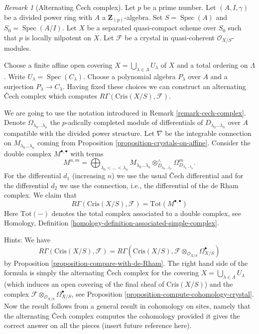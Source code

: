 \documentclass{stacks-project}
\theoremstyle{plain}
\theoremstyle{definition}
\theoremstyle{remark}
\newtheorem{remark}[subsection]{Remark}
\numberwithin{equation}{subsection}
\def\Spec{\mathop{\mathrm{Spec}}}
\begin{document}
\begin{remark}[Alternating {\v C}ech complex]
\label{remark-alternating-cech-complex}
Let $p$ be a prime number. Let $(A, I, \gamma)$ be a divided power
ring with $A$ a $\mathbf{Z}_{(p)}$-algebra. Set $S = \Spec(A)$ and
$S_0 = \Spec(A/I)$. Let $X$ be a separated quasi-compact scheme
over $S_0$ such that $p$ is locally nilpotent on $X$. Let
$\mathcal{F}$ be a crystal in quasi-coherent $\mathcal{O}_{X/S}$-modules.

\medskip\noindent
Choose a finite affine open covering
$X = \bigcup_{\lambda \in \Lambda} U_\lambda$ of $X$
and a total ordering on $\Lambda$.
Write $U_\lambda = \Spec(C_\lambda)$. Choose a polynomial algebra
$P_\lambda$ over $A$ and a surjection $P_\lambda \to C_\lambda$.
Having fixed these choices we can construct an alternating
{\v C}ech complex which computes $R\Gamma(\text{Cris}(X/S), \mathcal{F})$.

\medskip\noindent
We are going to use the notation introduced in
Remark \ref{remark-cech-complex}.
Denote $\Omega_{\lambda_0 \ldots \lambda_n}$
the $p$-adically completed module of differentials of
$D_{\lambda_0 \ldots \lambda_n}$ over $A$ compatible with the divided power
structure. Let $\nabla$ be the integrable connection on
$M_{\lambda_0 \ldots \lambda_n}$ coming from
Proposition \ref{proposition-crystals-on-affine}.
Consider the double complex $M^{\bullet, \bullet}$ with
terms
$$
M^{n, m} =
\bigoplus\nolimits_{\lambda_0 < \ldots < \lambda_n}
M_{\lambda_0 \ldots \lambda_n}
\otimes^\wedge_{D_{\lambda_0 \ldots \lambda_n}}
\Omega^m_{D_{\lambda_0 \ldots \lambda_n}}.
$$
For the differential $d_1$ (increasing $n$) we use the usual
{\v C}ech differential and for the differential $d_2$ we use
the connection, i.e., the differential of the de Rham complex.
We claim that
$$
R\Gamma(\text{Cris}(X/S), \mathcal{F}) = \text{Tot}(M^{\bullet, \bullet})
$$
Here $\text{Tot}(-)$ denotes the total complex associated to a
double complex, see
Homology, Definition \ref{homology-definition-associated-simple-complex}.

\medskip\noindent
Hints: We have
$$
R\Gamma(\text{Cris}(X/S), \mathcal{F}) = R\Gamma(\text{Cris}(X/S),
\mathcal{F} \otimes_{\mathcal{O}_{X/S}} \Omega_{X/S}^\bullet)
$$
by Proposition \ref{proposition-compare-with-de-Rham}.
The right hand side of the formula is simply the alternating {\v C}ech complex
for the covering $X = \bigcup_{\lambda \in \Lambda} U_\lambda$
(which induces an open covering of the final sheaf of $\text{Cris}(X/S)$)
and the complex $\mathcal{F} \otimes_{\mathcal{O}_{X/S}} \Omega_{X/S}^\bullet$,
see Proposition \ref{proposition-compute-cohomology-crystal}.
Now the result follows from a general result in cohomology on sites,
namely that the alternating {\v C}ech complex computes the cohomology
provided it gives the correct answer on all the pieces (insert future
reference here).
\end{remark}
\end{document}
